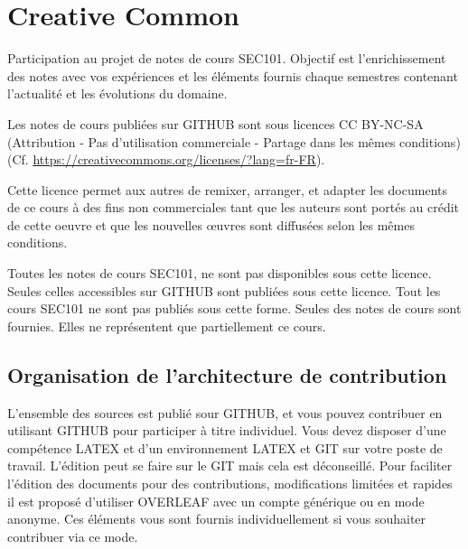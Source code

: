 

\section{Creative Common}


\begin{frame}

Participation au projet de notes de cours SEC101. Objectif est l'enrichissement des notes avec vos expériences et les éléments fournis chaque semestres contenant l'actualité et les évolutions du domaine.

\end{frame}

\begin{frame}

	
Les notes de cours publiées sur GITHUB sont sous licences CC BY-NC-SA (Attribution - Pas d’utilisation commerciale - Partage dans les mêmes conditions)(Cf. \url{https://creativecommons.org/licenses/?lang=fr-FR}).

Cette licence permet aux autres de remixer, arranger, et adapter les documents de ce cours à des fins non commerciales tant que les auteurs sont portés au crédit de cette oeuvre et que les nouvelles œuvres sont diffusées selon les mêmes conditions.

\end{frame}

Toutes les notes de cours SEC101, ne sont pas disponibles sous cette licence. Seules celles accessibles sur GITHUB sont publiées sous cette licence. Tout les cours SEC101 ne sont pas publiés sous cette forme. Seules des notes de cours sont fournies. Elles ne représentent que partiellement ce cours.




\subsection{Organisation de l'architecture de contribution}

L'ensemble des sources est publié sour GITHUB, et vous pouvez contribuer en utilisant GITHUB pour participer à titre individuel. Vous devez disposer d'une compétence LATEX et d'un environnement LATEX et GIT sur votre poste de travail. L'édition peut se faire sur le GIT mais cela est déconseillé. Pour faciliter l'édition des documents pour des contributions, modifications limitées et rapides il est proposé d'utiliser OVERLEAF avec un compte générique ou en mode anonyme. Ces éléments vous sont fournis individuellement si vous souhaiter contribuer via ce mode.

